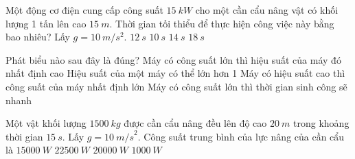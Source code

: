 \begin{ex}
		Một động cơ điện cung cấp công suất $\SI{15}{kW}$ cho một cần cẩu nâng vật có khối lượng 1 tấn lên cao $\SI{15}{m}$. Thời gian tối thiểu để thực hiện công việc này bằng bao nhiêu? Lấy $g=\SI{10}{m/s^2}$.
	\choice
	{$\SI{12}{s}$}
	{\True $\SI{10}{s}$}
	{$\SI{14}{s}$}
	{$\SI{18}{s}$}
\end{ex}
\begin{ex}
	Phát biểu nào sau đây là đúng?
	\choice
	{Máy có công suất lớn thì hiệu suất của máy đó nhất định cao}
	{Hiệu suất của một máy có thể lớn hơn 1}
	{Máy có hiệu suất cao thì công suất của máy nhất định lớn}
	{\True Máy có công suất lớn thì thời gian sinh công sẽ nhanh}
\end{ex}
\begin{ex}
	Một vật khối lượng $\SI{1500}{kg}$ được cần cẩu nâng đều lên độ cao $\SI{20}{m}$ trong khoảng thời gian $\SI{15}{s}$. Lấy $g = \SI{10}{m/s}^2$. Công suất trung bình của lực nâng của cần cẩu là
	\choice
	{$\SI{15000}{W}$}
	{$\SI{22500}{W}$}
	{\True $\SI{20000}{W}$}
	{$\SI{1000}{W}$}
\end{ex}
